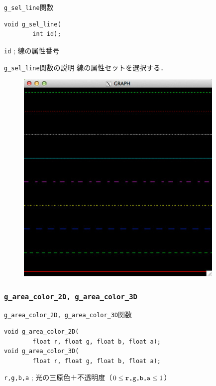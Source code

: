 \documentclass[platex,a4paper,12pt]{jsarticle}%
\begin{document}
\begin{itembox}[l]{\texttt{g\_sel\_line}関数}
\begin{verbatim}
void g_sel_line(
        int id);
\end{verbatim}
\verb|id| ; 線の属性番号
\end{itembox}

\begin{itembox}[l]{\texttt{g\_sel\_line}関数の説明}
線の属性セットを選択する．
\end{itembox}

\begin{figure}[htb]
\centering
\includegraphics[width=100mm]{Canvas_g_line.eps}
\end{figure}





\clearpage
\subsubsection{\texttt{g\_area\_color\_2D, g\_area\_color\_3D}}

\begin{itembox}[l]{\texttt{g\_area\_color\_2D, g\_area\_color\_3D}関数}
\begin{verbatim}
void g_area_color_2D(
        float r, float g, float b, float a);
void g_area_color_3D(
        float r, float g, float b, float a);
\end{verbatim}
\verb|r,g,b,a| ; 光の三原色＋不透明度（$0\leq \verb|r,g,b,a| \leq 1$）
\end{itembox}
\end{document}
